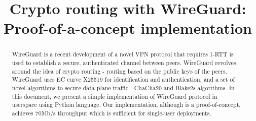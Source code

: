\documentclass[11pt,twoside,a4paper]{article}
\begin{document}
\sloppy
\title{Crypto routing with WireGuard: Proof-of-a-concept implementation}
\maketitle
\begin{abstract}
    WireGuard is a recent development of a novel VPN protocol that requires
    1-RTT is used to establish a secure, authenticated channel between peers. 
    WireGuard revolves around the idea of crypto routing - routing based on 
    the public keys of the peers. WireGuard uses EC curve X25519 for 
    identification and authentication, and a set of novel algorithms to secure 
    data plane traffic - ChaCha20 and Blake2s algorithms. In this document, we 
    present a simple implementation of WireGuard protocol in userspace using 
    Python language. Our implementation, although is a proof-of-concept, 
    achieves 70Mb/s throughput which is sufficient for single-user deployments.
\end{abstract}

 



\balance


\end{document}
